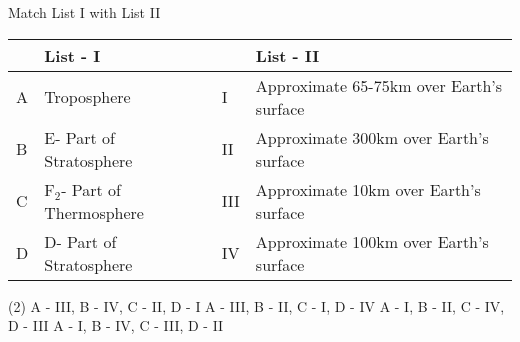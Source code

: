 \item Match List I with List II

\begin{center}
    \renewcommand{\arraystretch}{1.5}
    \begin{table}[h]
        \centering
        \begin{tabular}{p{0.25cm}p{8cm}|p{0.25cm}p{8cm}}
        \hline
        & List - I & &List - II \\
        \hline
        A & Troposphere & I & Approximate 65-75km over Earth's surface \\
        B & E- Part of Stratosphere & II & Approximate 300km over Earth's surface \\
        C & F$_2$- Part of Thermosphere & III & Approximate 10km over Earth's surface \\
        D & D- Part of Stratosphere & IV & Approximate 100km over Earth's surface \\
        \hline
        \end{tabular}
    \end{table}
\end{center}

\begin{tasks}(2)
    \task A - III, B - IV, C - II, D - I
    \task A - III, B - II, C - I, D - IV
    \task A - I, B - II, C - IV, D - III
    \task A - I, B - IV, C - III, D - II
\end{tasks}